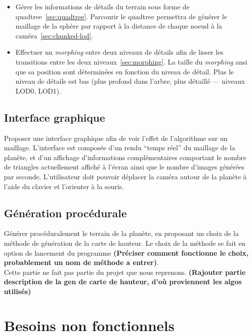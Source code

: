 \begin{itemize}
\item
  Gérer les informations de détails du terrain sous forme de
    quadtree~\ref{sec:quadtree}. Parcourir le quadtree permettra de
    générer le maillage de la sphère par rapport à la distance de chaque
    noeud à la caméra~\ref{sec:chunked-lod}.
\item
  Effectuer un \emph{morphing} entre deux niveaux de détails afin de
    lisser les transitions entre les deux niveaux~\ref{sec:morphing}. La
    taille du \emph{morphing} ansi que sa position sont déterminées en
    fonction du niveau de détail. Plus le niveau de détails est bas
    (plus profond dans l'arbre, plus détaillé --- niveaux LOD0, LOD1).
\end{itemize}

\subsection{Interface graphique}\label{interface-graphique}

Proposer une interface graphique afin de voir l'effet de l'algorithme
sur un maillage. L'interface est composée d'un rendu ``temps réel'' du
maillage de la planète, et d'un affichage d'informations complémentaires
comportant le nombre de triangles actuellement affiché à l'écran ainsi
que le nombre d'images générées par seconde. L'utilisateur doit pouvoir
déplacer la caméra autour de la planète à l'aide du clavier et
l'orienter à la souris.\\

\subsection{Génération procédurale}\label{generation-procedurale}

Générer procéduralement le terrain de la planète, en proposant un choix
de la méthode de génération de la carte de hauteur. Le choix de la
méthode se fait en option de lancement du programme \textbf{(Préciser
comment fonctionne le choix, probablement un nom de méthode a
entrer)}.\\
Cette partie ne fait pas partie du projet que nous reprenons.
\textbf{(Rajouter partie description de la gen de carte de hauteur, d'où
proviennent les algos utilisés)}

\section{Besoins non fonctionnels}\label{besoins-non-fonctionnels}

